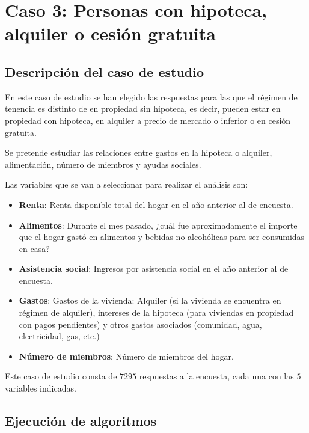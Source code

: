 
\chapter{Caso 3: Personas con hipoteca, alquiler o cesión gratuita}

\section{Descripción del caso de estudio}
En este caso de estudio se han elegido las respuestas para las que el régimen de tenencia es distinto de en propiedad sin hipoteca, es decir, pueden estar en propiedad con hipoteca, en alquiler a precio de mercado o inferior o en cesión gratuita.

Se pretende estudiar las relaciones entre gastos en la hipoteca o alquiler, alimentación, número de miembros y ayudas sociales.

Las variables que se van a seleccionar para realizar el análisis son:
\begin{itemize}
\item \textbf{Renta}: Renta disponible total del hogar en el año anterior al de encuesta.
\item \textbf{Alimentos}: Durante el mes pasado, ¿cuál fue aproximadamente el importe que el hogar gastó en alimentos y bebidas no alcohólicas para ser consumidas en casa?
\item \textbf{Asistencia social}: Ingresos por asistencia social en el año anterior al
de encuesta.
\item \textbf{Gastos}: Gastos de la vivienda: Alquiler (si la vivienda se encuentra en régimen de alquiler), intereses de la hipoteca (para viviendas en propiedad con pagos pendientes) y otros gastos asociados (comunidad, agua, electricidad, gas, etc.)
\item \textbf{Número de miembros}: Número de miembros del hogar.
\end{itemize}

Este caso de estudio consta de $7295$ respuestas a la encuesta, cada una con las $5$ variables indicadas.

\section{Ejecución de algoritmos}

